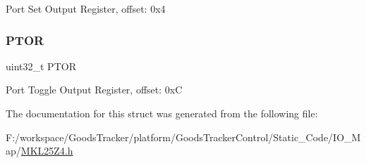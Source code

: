 Port Set Output Register, offset\+: 0x4 \mbox{\label{struct_f_g_p_i_o___mem_map_a2a8b6ad3b774b37fcdf9a0f04f56e43b}} 
\subsubsection{\texorpdfstring{P\+T\+OR}{PTOR}}
{\footnotesize\ttfamily uint32\+\_\+t P\+T\+OR}

Port Toggle Output Register, offset\+: 0xC 

The documentation for this struct was generated from the following file\+:\begin{DoxyCompactItemize}
\item 
F\+:/workspace/\+Goods\+Tracker/platform/\+Goods\+Tracker\+Control/\+Static\+\_\+\+Code/\+I\+O\+\_\+\+Map/\hyperlink{_m_k_l25_z4_8h}{M\+K\+L25\+Z4.\+h}\end{DoxyCompactItemize}
